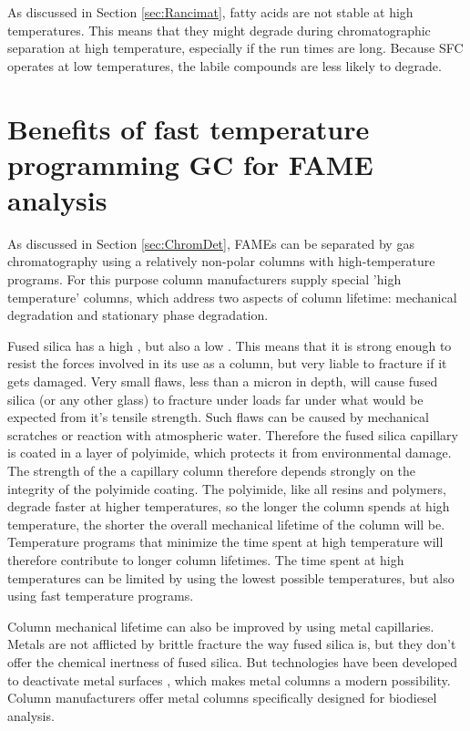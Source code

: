 As discussed in Section \ref{sec:Rancimat}, fatty acids are not stable at high
temperatures. This means that they might degrade during chromatographic
separation at high temperature, especially if the run times are long. Because
SFC operates at low temperatures, the labile compounds are less likely to degrade. 

\section[Benefits of fast GC]{Benefits of fast temperature programming GC for FAME analysis}

As discussed in Section \ref{sec:ChromDet}, FAMEs can be separated by gas
chromatography using a relatively non-polar columns with high-temperature
programs. For this purpose column manufacturers supply special 'high
temperature' columns, which address two aspects of column lifetime: mechanical
degradation and stationary phase degradation. 

Fused silica has a high , but also a low
. This means that it is strong enough to resist the
forces involved in its use as a column, but very liable to fracture if it gets
damaged. Very small flaws, less than a micron in depth, will cause fused silica
(or any other glass) to fracture under loads far under what would be expected
from it's tensile strength. Such flaws can be caused by mechanical scratches or
reaction with atmospheric water. Therefore the fused silica capillary is coated
in a layer of polyimide, which protects it from environmental damage. The
strength of the a capillary column therefore depends strongly on the integrity
of the polyimide coating. The polyimide, like all resins and polymers, degrade
faster at higher temperatures, so the longer the column spends at high
temperature, the shorter the overall mechanical lifetime of the column will be.
Temperature programs that minimize the time spent at high temperature will
therefore contribute to longer column lifetimes. The time spent at high
temperatures can be limited by using the lowest possible temperatures, but also
using fast temperature programs. 

Column mechanical lifetime can also be improved by using metal capillaries.
Metals are not afflicted by brittle fracture the way fused silica is, but they
don't offer the chemical inertness of fused silica. But technologies have been
developed to deactivate metal surfaces \autocite{Smith2002}, which makes metal
columns a modern possibility. Column manufacturers offer metal columns
specifically designed for biodiesel analysis.

